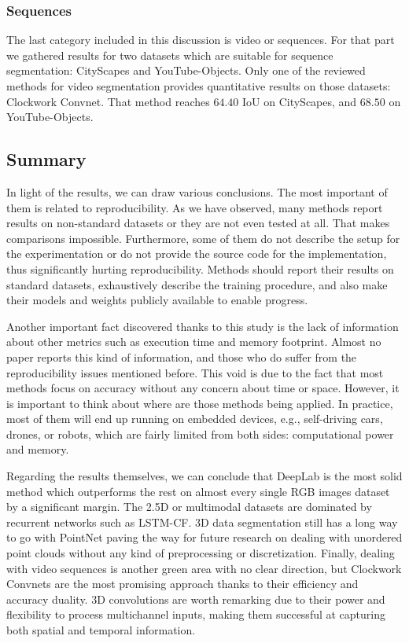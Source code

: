 \subsubsection{Sequences}

The last category included in this discussion is video or sequences. For that part we gathered results for two datasets which are suitable for sequence segmentation: CityScapes and YouTube-Objects. Only one of the reviewed methods for video segmentation provides quantitative results on those datasets: Clockwork Convnet. That method reaches $64.40$ \acs{IoU} on CityScapes, and $68.50$ on YouTube-Objects.

\subsection{Summary}

In light of the results, we can draw various conclusions. The most important of them is related to reproducibility. As we have observed, many methods report results on non-standard datasets or they are not even tested at all. That makes comparisons impossible. Furthermore, some of them do not describe the setup for the experimentation or do not provide the source code for the implementation, thus significantly hurting reproducibility. Methods should report their results on standard datasets, exhaustively describe the training procedure, and also make their models and weights publicly available to enable progress.

Another important fact discovered thanks to this study is the lack of information about other metrics such as execution time and memory footprint. Almost no paper reports this kind of information, and those who do suffer from the reproducibility issues mentioned before. This void is due to the fact that most methods focus on accuracy without any concern about time or space. However, it is important to think about where are those methods being applied. In practice, most of them will end up running on embedded devices, e.g., self-driving cars, drones, or robots, which are fairly limited from both sides: computational power and memory.

Regarding the results themselves, we can conclude that DeepLab is the most solid method which outperforms the rest on almost every single \acs{RGB} images dataset by a significant margin. The \acs{2.5D} or multimodal datasets are dominated by recurrent networks such as \acs{LSTM-CF}. \acs{3D} data segmentation still has a long way to go with PointNet paving the way for future research on dealing with unordered point clouds without any kind of preprocessing or discretization. Finally, dealing with video sequences is another green area with no clear direction, but Clockwork Convnets are the most promising approach thanks to their efficiency and accuracy duality. \acs{3D} convolutions are worth remarking due to their power and flexibility to process multichannel inputs, making them successful at capturing both spatial and temporal information.

